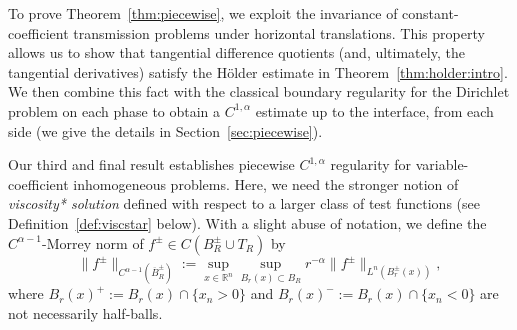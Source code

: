 \documentclass[letter,11pt]{amsart}
\newcommand{\R}{\mathbb{R}}
\theoremstyle{definition}
\numberwithin{equation}{section}
\begin{document}
\medskip

To prove Theorem~\ref{thm:piecewise}, we exploit the invariance of constant-coefficient transmission problems under horizontal translations.
This property allows us to show that tangential difference quotients (and, ultimately, the tangential derivatives) satisfy the H\"{o}lder estimate in Theorem~\ref{thm:holder:intro}.
We then combine this fact with the classical boundary regularity for the Dirichlet problem on each phase to obtain a $C^{1,\alpha}$ estimate up to the interface, from each side (we give the details in  Section~\ref{sec:piecewise}).

\medskip

Our third and final result establishes piecewise $C^{1,\alpha}$ regularity for variable-coefficient inhomogeneous problems.
Here, we need the stronger notion of \emph{viscosity* solution} defined with respect to a larger class of test functions (see Definition~\ref{def:viscstar} below).
With a slight abuse of notation, we define the $C^{\alpha-1}$-Morrey norm of $f^{\pm} \in C(B_R^{\pm} \cup T_R)$ by
\begin{equation}
\label{morrey}
\|f^{\pm}\|_{C^{\alpha-1}(\overline{B}^{\pm}_R)} := \sup_{x \in \R^n}\sup_{B_r(x) \subset B_R} r^{-\alpha} \|f^{\pm}\|_{L^{n}(B^{\pm}_r(x))},
\end{equation}
where $B_r(x)^{+} := B_r(x) \cap \{x_n > 0\}$ and $B_r(x)^{-} := B_r(x) \cap \{x_n < 0\}$ are not necessarily half-balls.
\end{document}
